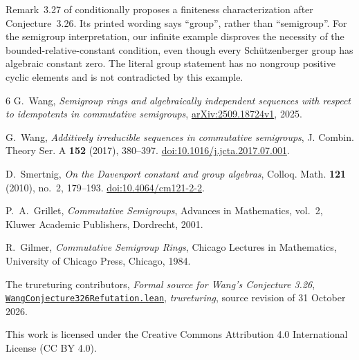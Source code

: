 \documentclass[11pt]{article}
\begin{document}
Remark~3.27 of \cite[p.~23]{Wang2025} conditionally proposes a finiteness
characterization after Conjecture~3.26. Its printed wording says
``group'', rather than ``semigroup''. For the semigroup interpretation,
our infinite example disproves the necessity of the bounded-relative-constant
condition, even though every Sch\"utzenberger group has algebraic
constant zero. The literal group statement has no nongroup positive
cyclic elements and is not contradicted by this example.

\begin{thebibliography}{6}
G.~Wang, \emph{Semigroup rings and algebraically independent sequences
with respect to idempotents in commutative semigroups},
\href{https://arxiv.org/abs/2509.18724v1}{arXiv:2509.18724v1}, 2025.

G.~Wang, \emph{Additively irreducible sequences in commutative semigroups},
J. Combin. Theory Ser. A \textbf{152} (2017), 380--397.
\href{https://doi.org/10.1016/j.jcta.2017.07.001}{doi:10.1016/j.jcta.2017.07.001}.

D.~Smertnig, \emph{On the Davenport constant and group algebras},
Colloq. Math. \textbf{121} (2010), no.~2, 179--193.
\href{https://doi.org/10.4064/cm121-2-2}{doi:10.4064/cm121-2-2}.

P.~A.~Grillet, \emph{Commutative Semigroups}, Advances in Mathematics,
vol.~2, Kluwer Academic Publishers, Dordrecht, 2001.

R.~Gilmer, \emph{Commutative Semigroup Rings}, Chicago Lectures in
Mathematics, University of Chicago Press, Chicago, 1984.

The trureturing contributors, \emph{Formal source for Wang's Conjecture 3.26},
\href{https://github.com/the-omega-institute/trureturing/blob/d1876cfbbef8c13023311126691b180eefa69569/D5/S0/Certificates/Algebra/WangConjecture326Refutation.lean}{\texttt{WangConjecture326Refutation.lean}},
\emph{trureturing}, source revision of 31 October 2026.
\end{thebibliography}

\smallskip
\noindent\small This work is licensed under the Creative Commons
Attribution 4.0 International License (CC BY 4.0).
\end{document}
